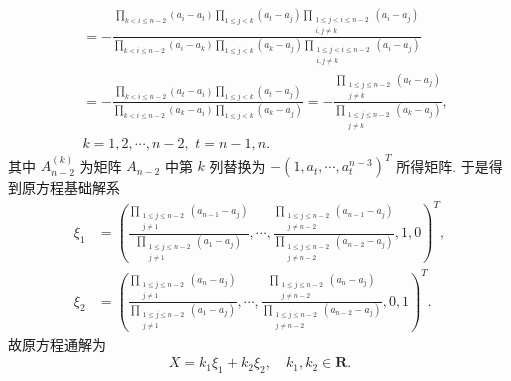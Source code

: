 \documentclass[../../main.tex]{subfiles}%
\begin{document}
\begin{solution}
\begin{align*}
\\
&=-\frac{\prod\limits_{k<i\leqslant n-2}{\left( a_i-a_t \right)}\prod\limits_{1\leqslant j<k}{\left( a_t-a_j \right)}\prod\limits_{\substack{1\leqslant j<i\leqslant n-2 \\ i,j\ne k}}{\left( a_i-a_j \right)}}{\prod\limits_{k<i\leqslant n-2}{\left( a_i-a_k \right)}\prod\limits_{1\leqslant j<k}{\left( a_k-a_j \right)}\prod\limits_{\substack{1\leqslant j<i\leqslant n-2 \\ i,j\ne k}}{\left( a_i-a_j \right)}}
\\
&=-\frac{\prod\limits_{k<i\leqslant n-2}{\left( a_t-a_i \right)}\prod\limits_{1\leqslant j<k}{\left( a_t-a_j \right)}}{\prod\limits_{k<i\leqslant n-2}{\left( a_k-a_i \right)}\prod\limits_{1\leqslant j<k}{\left( a_k-a_j \right)}}=-\frac{\prod\limits_{\substack{1\leqslant j\leqslant n-2 \\ j\ne k}}{\left( a_t-a_j \right)}}{\prod\limits_{\substack{1\leqslant j\leqslant n-2 \\ j\ne k}}{\left( a_k-a_j \right)}},
\\
&k=1,2,\cdots ,n-2,\,\, t=n-1,n.
\end{align*}
其中 \(A_{n-2}^{(k)}\) 为矩阵 \(A_{n-2}\) 中第 \(k\) 列替换为 \(-(1, a_t, \cdots, a_t^{n-3})^T\) 所得矩阵.
于是得到原方程基础解系
\begin{align*}
\xi_1 &= \left( \frac{\prod\limits_{\substack{1\leqslant j\leqslant n-2 \\ j\ne 1}}{\left( a_{n-1}-a_j \right)}}{\prod\limits_{\substack{1\leqslant j\leqslant n-2 \\ j\ne 1}}{\left( a_1-a_j \right)}},\cdots ,\frac{\prod\limits_{\substack{1\leqslant j\leqslant n-2 \\ j\ne n-2}}{\left( a_{n-1}-a_j \right)}}{\prod\limits_{\substack{1\leqslant j\leqslant n-2 \\ j\ne n-2}}{\left( a_{n-2}-a_j \right)}},1,0 \right) ^T, \\
\xi_2 &= \left( \frac{\prod\limits_{\substack{1\leqslant j\leqslant n-2 \\ j\ne 1}}{\left( a_n-a_j \right)}}{\prod\limits_{\substack{1\leqslant j\leqslant n-2 \\ j\ne 1}}{\left( a_1-a_j \right)}},\cdots ,\frac{\prod\limits_{\substack{1\leqslant j\leqslant n-2 \\ j\ne n-2}}{\left( a_n-a_j \right)}}{\prod\limits_{\substack{1\leqslant j\leqslant n-2 \\ j\ne n-2}}{\left( a_{n-2}-a_j \right)}},0,1 \right) ^T.
\end{align*}
故原方程通解为
\begin{align*}
X = k_1 \xi_1 + k_2 \xi_2 ,\quad k_1, k_2 \in \bm{R}.
\end{align*}
\end{solution}
\end{document}
